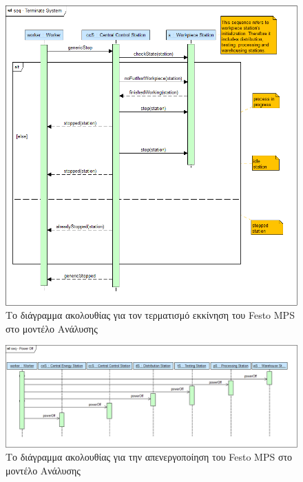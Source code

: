 \documentclass[a4paper,12pt,twoside]{report}
\begin{document}
{\begin{appendices}
			\begin{figure}[hp]
					\centering
					\includegraphics[scale=0.30]{AnalysisModel_seq-TerminateSystem.png}
					\caption{Το διάγραμμα ακολουθίας για τον τερματισμό εκκίνηση του Festo MPS στο μοντέλο Ανάλυσης}
					\label{φωτ:Το διάγραμμα ακολουθίας για τον τερματισμό του Festo MPS στο μοντέλο Ανάλυσης}
			\end{figure}
			
			\begin{figure}[hp]
					\centering
					\includegraphics[scale=0.30]{AnalysisModel_seq-PowerOff.png}
					\caption{Το διάγραμμα ακολουθίας για την απενεργοποίηση του Festo MPS στο μοντέλο Ανάλυσης}
					\label{φωτ:Το διάγραμμα ακολουθίας για την απενεργοποίηση του Festo MPS στο μοντέλο Ανάλυσης}
			\end{figure}
			

\end{appendices}}
\end{document}
